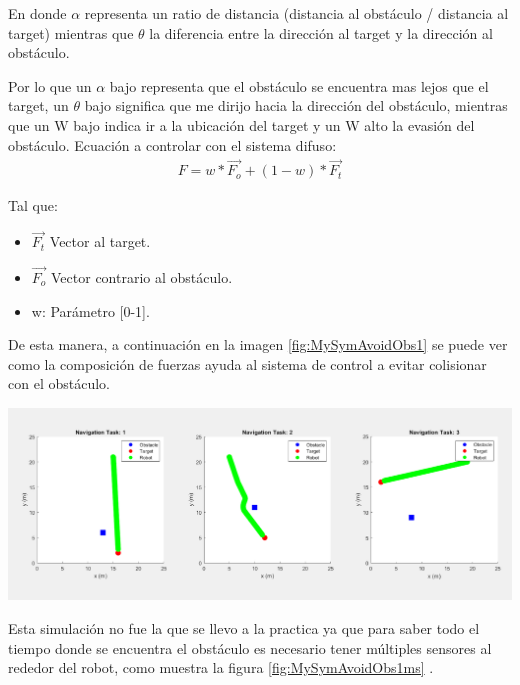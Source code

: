 
\bigbreak
En donde $\alpha$ representa un ratio de distancia (distancia al obstáculo / distancia al target) mientras que $\theta$ la diferencia entre la dirección al target y la dirección al obstáculo.\par
Por lo que un $\alpha$ bajo representa que el obstáculo se encuentra mas lejos que el target, un $\theta$ bajo significa que me dirijo hacia la dirección del obstáculo, mientras que un W bajo indica ir a la ubicación del target y un W alto la evasión del obstáculo.
\bigbreak
Ecuación a controlar con el sistema difuso:
\begin{equation}\boxed{
\begin{array}{rcl}
F = w*\vec{F_o} + (1-w)*\vec{F_t}
\end{array}}
\end{equation}

Tal que:
\begin{itemize}
    \item $\vec{F_t}$ Vector al target.
    \item $\vec{F_o}$ Vector contrario al obstáculo.
    \item w: Parámetro [0-1].
\end{itemize}

De esta manera, a continuación en la imagen \ref{fig:MySymAvoidObs1} se puede ver como la composición de fuerzas ayuda al sistema de control a evitar colisionar con el obstáculo.

\begin{center}
    \includegraphics[scale=0.3]{Tesis/Capitulos/04_CAPITULO_2/img/MySimAvoidObs1.png}
    \label{fig:MySymAvoidObs1}
\end{center}

Esta simulación no fue la que se llevo a la practica ya que para saber todo el tiempo donde se encuentra el obstáculo es necesario tener múltiples sensores al rededor del robot, como muestra la figura \ref{fig:MySymAvoidObs1ms} .\par

